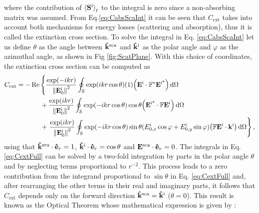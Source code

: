 %
where the contribution of $\ev{\vb{S}^\text{i}}_t$ to the integral is zero since a non-absorbing matrix was assumed. From Eq.\eqref{eq:CabsScaInt} it can be seen that $C_\text{ext}$ takes into account both mechanisms for energy losses (scattering and absorption), thus it is called the extinction cross section. To solve the integral in Eq. \eqref{eq:CabsScaInt} let us define $\theta$ as the angle between $\vu{k}^\text{sca}$ and $\vu{k}^\text{i}$ as the polar angle  and  $\varphi$ as the azimuthal angle, as shown in Fig \ref{fig:ScatPlane}. With this choice of coordinates,  the extinction cross section can be computed as
%
%
\begin{align}
C_\text{ext} = - &\Re \left\{
			 \frac{\exp(-ikr) }{\norm{\vb{E}_0^\text{i}}^2}
			 			\oint_\mathcal{S} \exp(ikr\cos\theta)(1)\qty(\vb{E}^\text{i}\cdot \mathbb{F}^*\vb{E}^\text{i*})  \dd{\Omega} \right.	\notag\\
			&\hspace*{1.5em}+\frac{\exp(ikr) }{\norm{\vb{E}_0^\text{i}}^2}
						\oint_\mathcal{S} \exp(-ikr\cos\theta)\cos\theta \qty(\vb{E}^\text{i*}\cdot \mathbb{F}\vb{E}^\text{i})     \dd{\Omega}
\label{eq:CextFull}\\
			&\hspace*{1.5em}+\left.\frac{\exp(ikr) }{\norm{\vb{E}^\text{i}_0}^2}
						\oint_\mathcal{S} \exp(-ikr\cos\theta)\sin\theta(E_{0,x}^\text{i}\cos\varphi+E_{0,y}^\text{i}\sin\varphi)
									\qty(\mathbb{F}\vb{E}^\text{i}\cdot\vb{k}^\text{i})    \dd{\Omega}  \right\}, \notag
\end{align}
%
using that $\vu{k}^\text{sca}\cdot\vu{e}_r = 1$, $\vu{k}^\text{i}\cdot\vu{e}_r = \cos\theta$ and  $\vb{E}^\text{sca}\cdot\vu{e}_r = 0$. The integrals in Eq. \eqref{eq:CextFull} can be solved by a two-fold integration by parts in the polar angle $\theta$ and by neglecting terms proportional to $r^{-2}$. This process leads to a zero contribution from the integrand proportional to $\sin\theta$  in Eq. \eqref{eq:CextFull} and, after rearranging the other terms in their real and imaginary parts, it follows that $C_\text{ext}$ depends only on the forward direction  $\vu{k}^\text{sca} = \vu{k}^\text{i}$ ($\theta =0$). This result is known as the Optical Theorem  whose mathematical expression is given by \cite{tsang_scattering_2000,pellarin_forward_2019,newton_optical_1976}:
